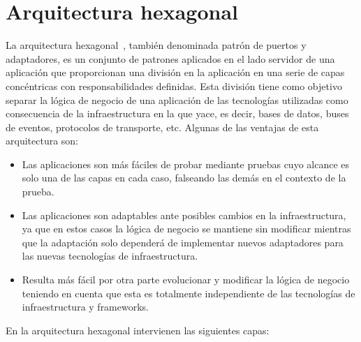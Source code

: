 \documentclass[a4paper, 12pt]{book}
\begin{document}
    \section{Arquitectura hexagonal}
    \label{sec:intro_desc_hexagonal_arch}

    La arquitectura hexagonal~\cite{bib:hex1, bib:hex2}, también denominada patrón de puertos y adaptadores, es un conjunto de patrones aplicados en el lado servidor de una aplicación
    que proporcionan una división en la aplicación en una serie de capas concéntricas con responsabilidades definidas.
    Esta división tiene como objetivo separar la lógica de negocio de una aplicación de las tecnologías utilizadas como consecuencia de la infraestructura en la que yace,
    es decir, bases de datos, buses de eventos, protocolos de transporte, etc. Algunas de las ventajas de esta arquitectura son:
    \begin{itemize}
        \item Las aplicaciones son más fáciles de probar mediante pruebas cuyo alcance es
        solo una de las capas en cada caso, falseando las demás en el contexto de la prueba.
        \item Las aplicaciones son adaptables ante posibles cambios en la infraestructura, ya que en estos casos la lógica de negocio se mantiene sin modificar
        mientras que la adaptación solo dependerá de implementar nuevos adaptadores para las nuevas tecnologías de infraestructura.
        \item Resulta más fácil por otra parte evolucionar y modificar la lógica de negocio teniendo en cuenta que esta es totalmente independiente de las tecnologías
        de infraestructura y frameworks.
    \end{itemize}

    En la arquitectura hexagonal intervienen las siguientes capas:
\end{document}
